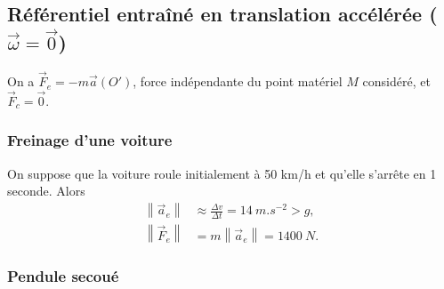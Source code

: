     \subsection[Référentiel entraîné en translation accélérée]{Référentiel entraîné en translation accélérée ($\vec{\omega}=\vec{0}$)}

        On a $\vec{F}_e=-m\vec{a}(O')$, force indépendante du point matériel $M$ considéré, et $\vec{F}_c=\vec{0}$.

        \subsubsection{Freinage d'une voiture}

            On suppose que la voiture roule initialement à 50 km/h et qu'elle s'arrête en 1 seconde. Alors
            \begin{equation}
                \begin{aligned}
                    \left\lVert\vec{a}_e\right\rVert&\approx\frac{\Delta v}{\Delta t}=14~m.s^{-2}>g,\\
                    \left\lVert\vec{F}_e\right\rVert&=m\left\lVert \vec{a}_e\right\rVert=1400~N.
                \end{aligned}
            \end{equation}

        \subsubsection{Pendule secoué}

